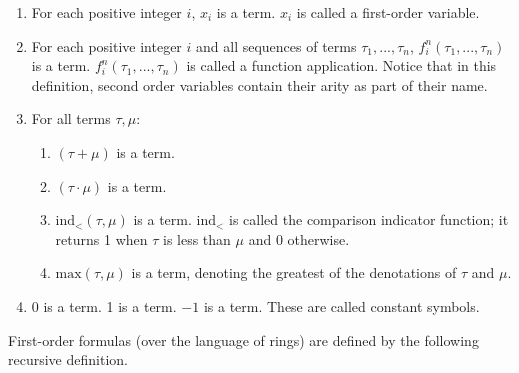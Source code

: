 \documentclass[11pt]{article}
\begin{document}
\begin{enumerate}
	\item For each positive integer $i$, $x_i$ is a term. $x_i$ is called a first-order variable.
	\item For each positive integer $i$ and all sequences of terms $\tau_1, ..., \tau_n$, $f^n_i(\tau_1, ..., \tau_n)$ is a term.
		$f^n_i(\tau_1, ..., \tau_n)$ is called a function application. Notice that in this
		definition, second order variables contain their arity as part of their name.
	\item For all terms $\tau, \mu$:
		\begin{enumerate}
			\item $(\tau + \mu)$ is a term.
			\item $(\tau \cdot \mu)$ is a term.
			\item $\text{ind}_<(\tau, \mu)$ is a term. $\text{ind}_<$ is called the
				comparison indicator function; it returns 1 when $\tau$ is less
				than $\mu$ and 0 otherwise.
			\item $\text{max}(\tau, \mu)$ is a term, denoting the greatest of the denotations of $\tau$ and $\mu$.
		\end{enumerate}
	\item $0$ is a term. 1 is a term. $-1$ is a term. These are called constant symbols.
\end{enumerate}

First-order formulas (over the language of rings) are defined by the following recursive definition.
\end{document}
